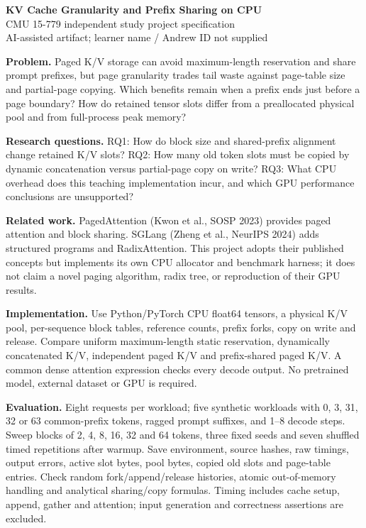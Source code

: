 \documentclass[10pt]{article}
\begin{document}
\begin{center}
{\Large\bfseries KV Cache Granularity and Prefix Sharing on CPU}\\[5pt]
CMU 15-779 independent study project specification\\
AI-assisted artifact; learner name / Andrew ID not supplied
\end{center}

\textbf{Problem.} Paged K/V storage can avoid maximum-length reservation and share prompt prefixes, but page granularity trades tail waste against page-table size and partial-page copying. Which benefits remain when a prefix ends just before a page boundary? How do retained tensor slots differ from a preallocated physical pool and from full-process peak memory?

\textbf{Research questions.} RQ1: How do block size and shared-prefix alignment change retained K/V slots? RQ2: How many old token slots must be copied by dynamic concatenation versus partial-page copy on write? RQ3: What CPU overhead does this teaching implementation incur, and which GPU performance conclusions are unsupported?

\textbf{Related work.} PagedAttention (Kwon et al., SOSP 2023) provides paged attention and block sharing. SGLang (Zheng et al., NeurIPS 2024) adds structured programs and RadixAttention. This project adopts their published concepts but implements its own CPU allocator and benchmark harness; it does not claim a novel paging algorithm, radix tree, or reproduction of their GPU results.

\textbf{Implementation.} Use Python/PyTorch CPU float64 tensors, a physical K/V pool, per-sequence block tables, reference counts, prefix forks, copy on write and release. Compare uniform maximum-length static reservation, dynamically concatenated K/V, independent paged K/V and prefix-shared paged K/V. A common dense attention expression checks every decode output. No pretrained model, external dataset or GPU is required.

\textbf{Evaluation.} Eight requests per workload; five synthetic workloads with 0, 3, 31, 32 or 63 common-prefix tokens, ragged prompt suffixes, and 1--8 decode steps. Sweep blocks of 2, 4, 8, 16, 32 and 64 tokens, three fixed seeds and seven shuffled timed repetitions after warmup. Save environment, source hashes, raw timings, output errors, active slot bytes, pool bytes, copied old slots and page-table entries. Check random fork/append/release histories, atomic out-of-memory handling and analytical sharing/copy formulas. Timing includes cache setup, append, gather and attention; input generation and correctness assertions are excluded.
\end{document}
